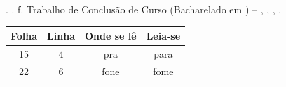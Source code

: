 \newpage
{}

{\noindent \authorsCitation{} \textbf{\workTitle}\ifdefempty{\workSubtitle}{}{: \workSubtitle}. \workYear. \pageref{LastPage} f. Trabalho de Conclusão de Curso (Bacharelado em \courseName) -- \centerName, \universityName, \workCity, \workYear.\par}
\vspace{\baselineskip}

\begin{center}
\begin{tabular}{cccc}
\toprule
\textbf{Folha} & \textbf{Linha} & \textbf{Onde se lê} & \textbf{Leia-se} \\
\midrule
15 & 4 & pra & para \\
22 & 6 & fone & fome \\
\bottomrule
\end{tabular}
\end{center}
